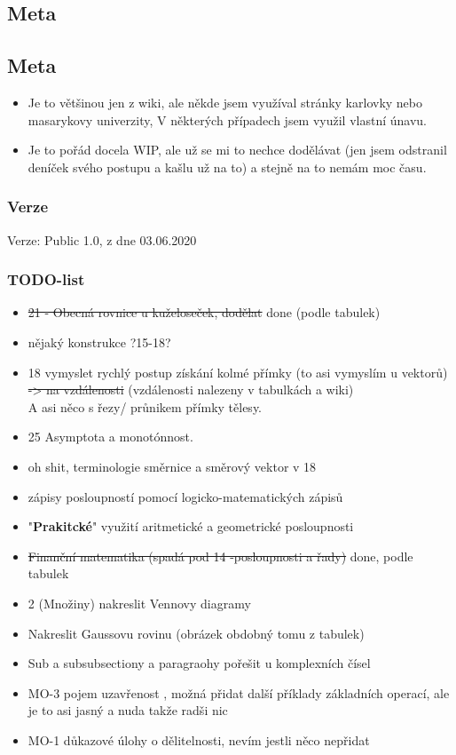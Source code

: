 \documentclass[12pt]{article}
\begin{document}
\rightline{\today}

\subsection{Meta}
\subsection{Meta}
\begin{itemize}
\item Je to většinou jen z wiki, ale někde jsem využíval stránky karlovky nebo masarykovy univerzity, V některých případech jsem využil vlastní únavu.
\item Je to pořád docela WIP, ale už se mi to nechce dodělávat (jen jsem odstranil deníček svého postupu a kašlu už na to) a stejně na to nemám moc času.
\end{itemize}
\subsubsection{Verze}
Verze: Public 1.0, z dne 03.06.2020
\subsubsection{TODO-list}
\begin{itemize}
\item  \st{21 - Obecná rovnice u kuželoseček, dodělat} done (podle tabulek)
\item nějaký konstrukce ?15-18?
\item 18 vymyslet rychlý postup získání kolmé přímky (to asi vymyslím u vektorů)  \st{-> na vzdálenosti} (vzdálenosti nalezeny v tabulkách a wiki)\\ A asi něco s řezy/ průnikem přímky tělesy.
\item 25 Asymptota a monotónnost.
\item oh shit, terminologie směrnice a směrový vektor v 18
\item zápisy posloupností pomocí logicko-matematických zápisů
\item "\textbf{Prakitcké}" využití aritmetické a geometrické posloupnosti
\item \st{Finanční matematika (spadá pod 14 -posloupnosti a řady)} done, podle tabulek
\item 2 (Množiny) nakreslit Vennovy diagramy
\item Nakreslit Gaussovu rovinu (obrázek obdobný tomu z tabulek)
\item Sub a subsubsectiony a paragraohy pořešit u komplexních čísel
\item MO-3 pojem uzavřenost , možná přidat další příklady základních operací, ale je to asi jasný a nuda takže radši nic
\item MO-1 důkazové úlohy o dělitelnosti, nevím jestli něco nepřidat
\end{itemize}
\end{document}
